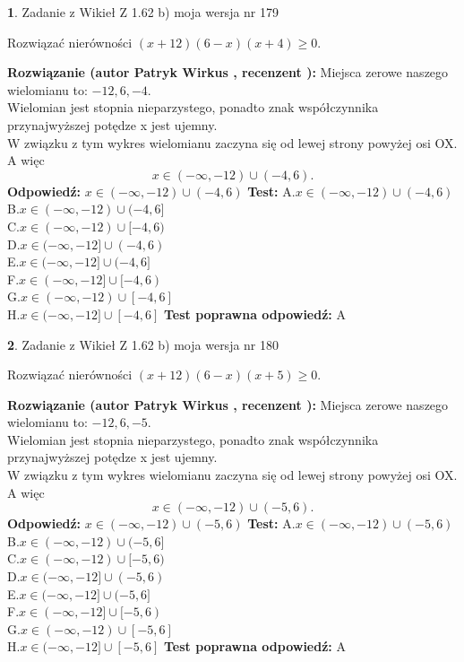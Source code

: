 \documentclass[12pt, a4paper]{article}
\theoremstyle{definition} %
\newtheorem{zad}{}
\newcommand{\zadStart}[1]{\begin{zad}#1\newline}
\newcommand{\zadStop}{\end{zad}}
\newcommand{\rozwStart}[2]{\noindent \textbf{Rozwiązanie (autor #1 , recenzent #2): }\newline}
\newcommand{\rozwStop}{\newline}
\newcommand{\odpStart}{\noindent \textbf{Odpowiedź:}\newline}
\newcommand{\odpStop}{\newline}
\newcommand{\testStart}{\noindent \textbf{Test:}\newline}
\newcommand{\testStop}{\newline}
\newcommand{\kluczStart}{\noindent \textbf{Test poprawna odpowiedź:}\newline}
\newcommand{\kluczStop}{\newline}
\begin{document}
\zadStart{Zadanie z Wikieł Z 1.62 b) moja wersja nr 179}

Rozwiązać nierówności $(x+12)(6-x)(x+4)\ge0$.
\zadStop
\rozwStart{Patryk Wirkus}{}
Miejsca zerowe naszego wielomianu to: $-12, 6, -4$.\\
Wielomian jest stopnia nieparzystego, ponadto znak współczynnika przy\linebreak najwyższej potędze x jest ujemny.\\ W związku z tym wykres wielomianu zaczyna się od lewej strony powyżej osi OX. A więc $$x \in (-\infty,-12) \cup (-4,6).$$
\rozwStop
\odpStart
$x \in (-\infty,-12) \cup (-4,6)$
\odpStop
\testStart
A.$x \in (-\infty,-12) \cup (-4,6)$\\
B.$x \in (-\infty,-12) \cup (-4,6]$\\
C.$x \in (-\infty,-12) \cup [-4,6)$\\
D.$x \in (-\infty,-12] \cup (-4,6)$\\
E.$x \in (-\infty,-12] \cup (-4,6]$\\
F.$x \in (-\infty,-12] \cup [-4,6)$\\
G.$x \in (-\infty,-12) \cup [-4,6]$\\
H.$x \in (-\infty,-12] \cup [-4,6]$
\testStop
\kluczStart
A
\kluczStop



\zadStart{Zadanie z Wikieł Z 1.62 b) moja wersja nr 180}

Rozwiązać nierówności $(x+12)(6-x)(x+5)\ge0$.
\zadStop
\rozwStart{Patryk Wirkus}{}
Miejsca zerowe naszego wielomianu to: $-12, 6, -5$.\\
Wielomian jest stopnia nieparzystego, ponadto znak współczynnika przy\linebreak najwyższej potędze x jest ujemny.\\ W związku z tym wykres wielomianu zaczyna się od lewej strony powyżej osi OX. A więc $$x \in (-\infty,-12) \cup (-5,6).$$
\rozwStop
\odpStart
$x \in (-\infty,-12) \cup (-5,6)$
\odpStop
\testStart
A.$x \in (-\infty,-12) \cup (-5,6)$\\
B.$x \in (-\infty,-12) \cup (-5,6]$\\
C.$x \in (-\infty,-12) \cup [-5,6)$\\
D.$x \in (-\infty,-12] \cup (-5,6)$\\
E.$x \in (-\infty,-12] \cup (-5,6]$\\
F.$x \in (-\infty,-12] \cup [-5,6)$\\
G.$x \in (-\infty,-12) \cup [-5,6]$\\
H.$x \in (-\infty,-12] \cup [-5,6]$
\testStop
\kluczStart
A
\kluczStop
\end{document}
